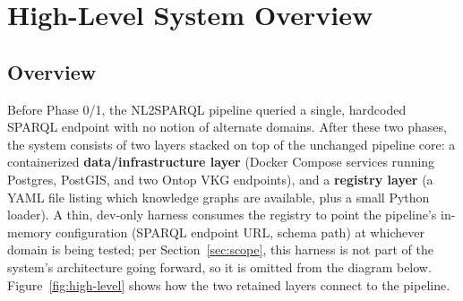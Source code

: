 \documentclass[11pt,a4paper]{article}
\begin{document}
\section{High-Level System Overview}

\subsection{Overview}

Before Phase 0/1, the NL2SPARQL pipeline queried a single, hardcoded SPARQL endpoint with no
notion of alternate domains. After these two phases, the system consists of two layers stacked
on top of the unchanged pipeline core: a containerized \textbf{data/infrastructure layer}
(Docker Compose services running Postgres, PostGIS, and two Ontop VKG endpoints), and a
\textbf{registry layer} (a YAML file listing which knowledge graphs are available, plus a small
Python loader). A thin, dev-only harness consumes the registry to point the pipeline's
in-memory configuration (SPARQL endpoint URL, schema path) at whichever domain is being tested;
per Section~\ref{sec:scope}, this harness is not part of the system's architecture going
forward, so it is omitted from the diagram below. Figure~\ref{fig:high-level} shows how the two
retained layers connect to the pipeline.
\end{document}
